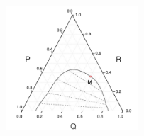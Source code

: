 \documentclass{article}
\begin{document}
\begin{figure}[ht] %
    \includegraphics[width=0.442\textwidth, frame]{ternary3.png}
\end{figure}
\end{document}
